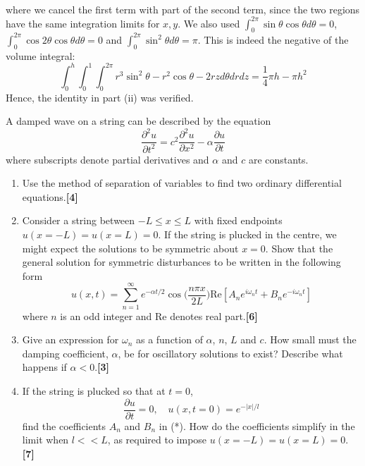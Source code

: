 \documentclass[a4paper]{article}
\begin{document}
\begin{ans}
\begin{enumerate}[label=(\roman*)]
\begin{eqnarray}
\end{eqnarray}
where we cancel the first term with part of the second term, since the two regions have the same integration limits for $x,y$. We also used $\int_0^{2\pi}\sin\theta\cos\theta d\theta=0$, $\int_0^{2\pi}\cos2\theta\cos\theta d\theta=0$ and $\int_0^{2\pi}\sin^2\theta d\theta=\pi$. This is indeed the negative of the volume integral:
$$\int_0^h\int_0^1\int_0^{2\pi}r^3\sin^2\theta-r^2\cos\theta-2rzd\theta drdz=\frac{1}{4}\pi h-\pi h^2$$
Hence, the identity in part (ii) was verified.
\end{enumerate}
\end{ans}
\newpage
\begin{qns}
A damped wave on a string can be described by the equation
$$\frac{\partial^2u}{\partial t^2}=c^2\frac{\partial^2u}{\partial x^2}-\alpha\frac{\partial u}{\partial t}$$
where subscripts denote partial derivatives and $\alpha$ and $c$ are constants.
\begin{enumerate}[label=(\roman*)]
    \item Use the method of separation of variables to find two ordinary differential equations.\hfill \textbf{[4]}
    \item Consider a string between $-L\leq x\leq L$ with fixed endpoints $u(x=-L)=u(x=L)=0$. If the string is plucked in the centre, we might expect the solutions to be symmetric about $x=0$. Show that the general solution for symmetric disturbances to be written in the following form
\begin{equation}
u(x,t)=\sum_{n=1}^\infty e^{-\alpha t/2}\cos\bigg(\frac{n\pi x}{2L}\bigg)\text{Re}[A_ne^{i\omega_nt}+B_ne^{-i\omega_nt}]\tag{*}
\end{equation}
where $n$ is an odd integer and $\text{Re}$ denotes real part.\hfill \textbf{[6]}
\item Give an expression for $\omega_n$ as a function of $\alpha$, $n$, $L$ and $c$. How small must the damping coefficient, $\alpha$, be for oscillatory solutions to exist? Describe what happens if $\alpha<0$.\hfill \textbf{[3]}
\item If the string is plucked so that at $t=0$,
$$\frac{\partial u}{\partial t}=0,\quad u(x,t=0)=e^{-|x|/l}$$
find the coefficients $A_n$ and $B_n$ in (*). How do the coefficients simplify in the limit when $l<<L$, as required to impose $u(x=-L)=u(x=L)=0$. \hfill \textbf{[7]}
\end{enumerate}
\end{qns}
\end{document}
